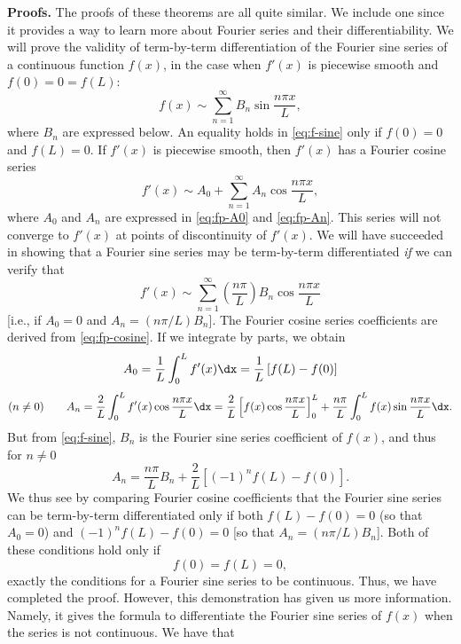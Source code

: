 \textbf{Proofs.}  The proofs of these theorems are all quite similar.  We include one since it provides a way to learn more about Fourier series and their differentiability.  We will prove the validity of term-by-term differentiation of the Fourier sine series of a continuous function $f(x)$, in the case when $f'(x)$ is piecewise smooth and $f(0) = 0 = f(L)$:
\begin{equation}
\label{eq:f-sine}
f(x) \sim \sum_{n=1}^{\infty} B_n \sin \frac{n\pi x}{L},
\end{equation}
where $B_n$ are expressed below.  An equality holds in \eqref{eq:f-sine} only if $f(0) = 0$ and $f(L) = 0$.  If $f'(x)$ is piecewise smooth, then $f'(x)$ has a Fourier cosine series
\begin{equation}
\label{eq:fp-cosine}
f'(x) \sim A_0 + \sum_{n=1}^{\infty} A_n \cos \frac{n\pi x}{L},
\end{equation}
where $A_0$ and $A_n$ are expressed in \eqref{eq:fp-A0} and \eqref{eq:fp-An}.  This series will not converge to $f'(x)$ at points of discontinuity of $f'(x)$.  We will have succeeded in showing that a Fourier sine series may be term-by-term differentiated \textit{if} we can verify that
\[
f'(x) \sim \sum_{n=1}^{\infty} \left(\frac{n\pi}{L}\right) B_n \cos \frac{n\pi x}{L}
\]
[i.e., if $A_0 = 0$ and $A_n = (n\pi/L)B_n$].  The Fourier cosine series coefficients are derived from \eqref{eq:fp-cosine}.  If we integrate by parts, we obtain
\begin{equation}
\label{eq:fp-A0}
A_0 = \frac{1}{L} \int_0^{L} f'(x) \dx = \frac{1}{L}\left[f(L) - f(0)\right]
\end{equation}
\begin{equation}
\label{eq:fp-An}
(n \ne 0) \qquad A_n = \frac{2}{L} \int_0^{L} f'(x) \cos \frac{n\pi x}{L} \dx = \frac{2}{L}\left[f(x)\cos\frac{n\pi x}{L}\right]_0^{L} + \frac{n\pi}{L} \int_0^{L} f(x) \sin \frac{n\pi x}{L} \dx.
\end{equation}
But from \eqref{eq:f-sine}, $B_n$ is the Fourier sine series coefficient of $f(x)$, and thus for $n \ne 0$
\begin{equation}
\label{eq:An-Bn}
A_n = \frac{n\pi}{L} B_n + \frac{2}{L}\left[(-1)^n f(L) - f(0)\right].
\end{equation}
We thus see by comparing Fourier cosine coefficients that the Fourier sine series can be term-by-term differentiated only if both $f(L) - f(0) = 0$ (so that $A_0 = 0$) and $(-1)^n f(L) - f(0) = 0$ [so that $A_n = (n\pi/L)B_n$].  Both of these conditions hold only if
\[
f(0) = f(L) = 0,
\]
exactly the conditions for a Fourier sine series to be continuous.  Thus, we have completed the proof.  However, this demonstration has given us more information.  Namely, it gives the formula to differentiate the Fourier sine series of $f(x)$ when the series is not continuous.  We have that

